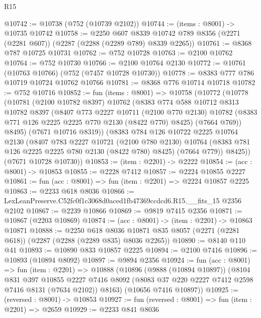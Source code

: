 \begin{lexlean}{R15}
\begin{coremodule}
@10742 := @10738 (@752 (@10739 @2102))
@10744 := (items : @8001) -> @10735 @10742
@10758 := @2250
    @607
    @8339
    @10742
    @789
    @8356
    (@2271 (@2281 @607))
    (@2287 (@2288 (@2289 @789) @8339 @2265))
@10761 := @8368 @787 @10725 @10731
@10762 := @752 @10728
@10763 := @2100 @10762
@10764 := @752 @10730
@10766 := @2100 @10764 @2130
@10772 := @10761 (@10763 @10766) (@752 (@7457 @10728 @10730))
@10778 := @8383 @777 @786 @10719 @10724 @10762 @10766
@10781 := @8368 @776 @10714 @10718
@10782 := @752 @10716
@10852 := fun (items : @8001) =>
  @10758
    (@10772
      (@10778
        (@10781
          (@2100 @10782 @8397)
          @10762
          (@8383
            @774
            @588
            @10712
            @8313
            @10782
            @8397
            (@8407
              @773
              @2227
              @10711
              (@2100 @770 @2130)
              @10782
              (@8383 @771 @126 @2225 @2225 @770 @2130 (@8422 @770) @8425)
              (@7664 @769))
            @8495)
          (@7671 @10716 @8319))
        (@8383
          @784
          @126
          @10722
          @2225
          @10764
          @2130
          (@8407
            @783
            @2227
            @10721
            (@2100 @780 @2130)
            @10764
            (@8383 @781 @126 @2225 @2225 @780 @2130 (@8422 @780) @8425)
            (@7664 @779))
          @8425))
      (@7671 @10728 @10730))
@10853 := (item : @2201) -> @2222
@10854 := (acc : @8001) -> @10853
@10855 := @2228 @7412
@10857 := @2224 @10855 @2227
@10861 := fun (acc : @8001) => fun (item : @2201) => @2224 @10857 @2225
@10863 := @2233 @618 @8036
@10866 := LexLeanPreserve.C52fc0f1c3068d0aced1fb47369ccdcd6.R15.__fits_15 @2356 @2102
@10867 := @2239 @10866
@10869 := @9819 @7415 @2356
@10871 := @10867 (@2203 @10869)
@10874 := (acc : @8001) -> (item : @2201) -> @10863 @10871
@10888 := @2250
    @618
    @8036
    @10871
    @835
    @8057
    (@2271 (@2281 @618))
    (@2287 (@2288 (@2289 @835) @8036 @2265))
@10890 := @8140 @110 @41
@10893 := @10890 @833 @10857 @2225
@10894 := @2100 @7416
@10896 := @10893 (@10894 @8092)
@10897 := @9894 @2356
@10924 := fun (acc : @8001) =>
  fun (item : @2201) =>
  @10888
    (@10896
      (@9888 (@10894 @10897))
      (@8104
        @831
        @397
        @10855
        @2227
        @7416
        @8092
        (@8083 @37 @220 @2227 @7412 @2598 @7416 @8131 (@7634 @2102))
        @8163)
      (@10656 @7416 @10897))
@10925 := (reversed : @8001) -> @10853
@10927 := fun (reversed : @8001) => fun (item : @2201) => @2659
@10929 := @2233 @841 @8036

\end{coremodule}
\end{lexlean}
